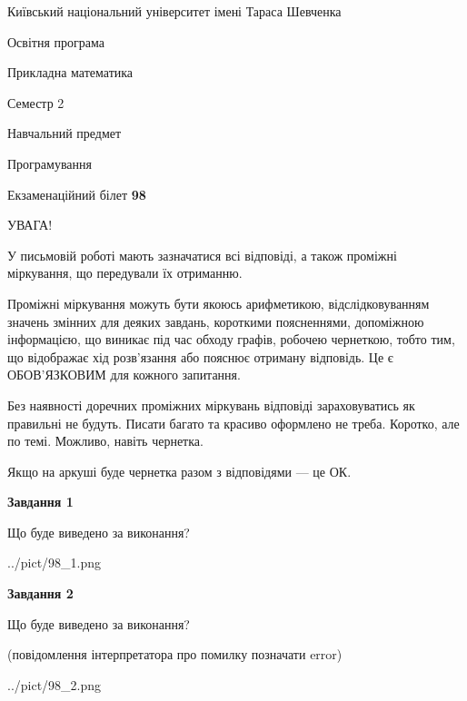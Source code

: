 \documentclass[12pt, ukrainian]{article}
\begin{document}
{{\begin {small}\par
{ \center  Київський національний університет імені Тараса Шевченка \par}
{\parbox {5 cm}{Освітня програма \hfill}{\parbox {7 cm}{Прикладна математика\hfill}}\parbox {6 cm}{\hfill Семестр 2}}\par
{\parbox {5 cm} {Навчальний предмет \hfill}\parbox {7 cm}{Програмування \hfill}\parbox {6cm}{\hfill}\par}\vspace{-7pt} \end{small}}{\center Екзаменаційний білет \No \textbf
{ 98 }\par}}
{
\begin {large}
УВАГА!

У письмовій роботі мають зазначатися всі відповіді, а також проміжні міркування, що передували їх отриманню.

Проміжні міркування можуть бути якоюсь арифметикою, відслідковуванням зна\-чень змінних для деяких завдань,
короткими поясненнями, допоміжною інформацією, що виникає під час обходу графів, робочею чернеткою,
тобто тим, що відображає хід розв’язання або пояснює отриману відповідь.
Це є ОБОВ’ЯЗКОВИМ для кожного запитання.

Без наявності доречних проміжних міркувань відповіді зараховуватись як правиль\-ні не будуть.
Писати багато та красиво оформлено не треба. Коротко, але по темі. Можли\-во, навіть чернетка.

Якщо на аркуші буде чернетка разом з відповідями --- це ОК.

\newpage

{\begin {center}\textbf{Завдання 1}\end {center}}\par
Що буде виведено за виконання?\par
\begin{center}
	{../pict/98_1.png}
\end{center}
\newpage

{\begin {center}\textbf{Завдання 2}\end {center}}\par
Що буде виведено за виконання?\par
 (повідомлення інтерпретатора про помилку позначати error)\par
\begin{center}
	{../pict/98_2.png}
\end{center}
\newpage


\end{large}}
\end{document}
